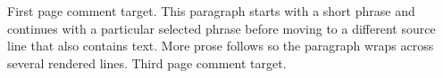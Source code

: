 \documentclass{article}
\begin{document}
First page comment target.
\newpage
This paragraph starts with a short phrase
and continues with a particular selected phrase
before moving to a different source line that also contains text.
More prose follows so the paragraph wraps across several rendered lines.
\newpage
Third page comment target.
\end{document}
